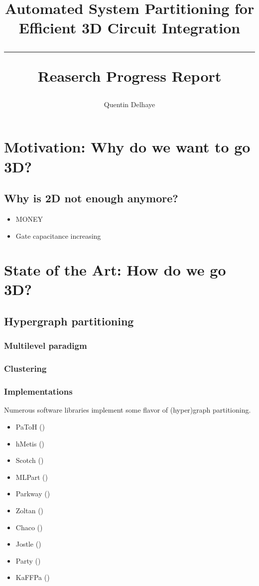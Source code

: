 \documentclass[12pt,a4paper]{article}
\author{Quentin Delhaye}
\title{Automated System Partitioning for Efficient 3D Circuit Integration \\ \vspace{.5em} \hrule \vspace{.5em} \large Reaserch Progress Report}
\theoremstyle{customdef}
\begin{document}
\maketitle
\tableofcontents
\citet{Ihler1993}

\section{Motivation: Why do we want to go 3D?}
\subsection{Why is 2D not enough anymore?}
\begin{itemize}
	\item MONEY
	\item Gate capacitance increasing
\end{itemize}


\section{State of the Art: How do we go 3D?}
\subsection{Hypergraph partitioning}
\subsubsection{Multilevel paradigm}
\subsubsection{Clustering}
\subsubsection{Implementations}
Numerous software libraries implement some flavor of (hyper)graph partitioning.
\begin{itemize}
	\item PaToH (\citet{Aykanat2011})
	\item hMetis (\citet{Karypis1999})
	\item Scotch (\citet{Aykanat2011})
	\item MLPart (\citet{Caldwell2000})
	\item Parkway (\citet{Trifunovic2008})
	\item Zoltan (\citet{Devine2006})
	\item Chaco (\citet{Lotfifar2015})
	\item Jostle (\citet{Walshaw1998})
	\item Party (\citet{Preis97party})
	\item KaFFPa (\citet{Holtgrewe2010})
\end{itemize}
\end{document}
